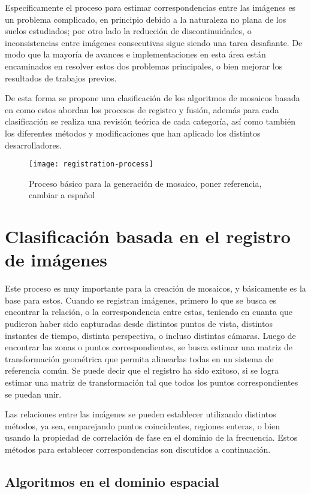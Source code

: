 Específicamente el proceso para estimar correspondencias entre las imágenes es un problema complicado, en principio debido a la naturaleza no plana de los suelos estudiados; por otro lado la reducción de discontinuidades, o inconsistencias entre imágenes consecutivas sigue siendo una tarea desafiante. De modo que la mayoría de avances e implementaciones en esta área están encaminados en resolver estos dos problemas principales, o bien mejorar los resultados de trabajos previos.

De esta forma se propone una clasificación de los algoritmos de mosaicos basada en como estos abordan los procesos de registro y fusión, además para cada clasificación se realiza una revisión teórica de cada categoría, así como también los diferentes métodos y modificaciones que han aplicado los distintos desarrolladores. 

\begin{figure}[H]
	\centerline{
		\texttt{[image: registration-process]}}
	\caption{Proceso básico para la generación de mosaico, poner referencia, cambiar a español}
	\label{imagen:mosaic-process}
\end{figure}

\section*{Clasificación basada en el registro de imágenes}

Este proceso es muy importante para la creación de mosaicos, y básicamente es la base para estos. Cuando se registran imágenes, primero lo que se busca es encontrar la relación, o la correspondencia entre estas, teniendo en cuanta que pudieron haber sido capturadas desde distintos puntos de vista, distintos instantes de tiempo, distinta perspectiva, o incluso distintas cámaras. Luego de encontrar las zonas o puntos correspondientes, se busca estimar una matriz de transformación geométrica que permita alinearlas todas en un sistema de referencia común. Se puede decir que el registro ha sido exitoso, si se logra estimar una matriz de transformación tal que todos los puntos correspondientes se puedan unir.

Las relaciones entre las imágenes se pueden establecer utilizando distintos métodos, ya sea, emparejando puntos coincidentes, regiones enteras, o bien usando la propiedad de correlación de fase en el dominio de la frecuencia. Estos métodos para establecer correspondencias son discutidos a continuación.

\subsection*{Algoritmos en el dominio espacial}

